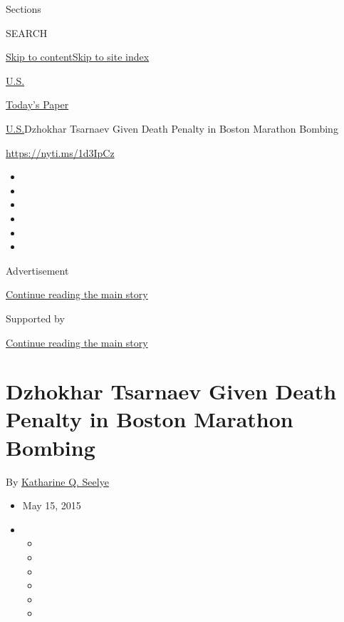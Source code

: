 Sections

SEARCH

\protect\hyperlink{site-content}{Skip to
content}\protect\hyperlink{site-index}{Skip to site index}

\href{https://www.nytimes.com/section/us}{U.S.}

\href{https://myaccount.nytimes.com/auth/login?response_type=cookie\&client_id=vi}{}

\href{https://www.nytimes.com/section/todayspaper}{Today's Paper}

\href{/section/us}{U.S.}\textbar{}Dzhokhar Tsarnaev Given Death Penalty
in Boston Marathon Bombing

\url{https://nyti.ms/1d3IpCz}

\begin{itemize}
\item
\item
\item
\item
\item
\item
\end{itemize}

Advertisement

\protect\hyperlink{after-top}{Continue reading the main story}

Supported by

\protect\hyperlink{after-sponsor}{Continue reading the main story}

\hypertarget{dzhokhar-tsarnaev-given-death-penalty-in-boston-marathon-bombing}{%
\section{Dzhokhar Tsarnaev Given Death Penalty in Boston Marathon
Bombing}\label{dzhokhar-tsarnaev-given-death-penalty-in-boston-marathon-bombing}}

By \href{http://www.nytimes.com/by/katharine-q-seelye}{Katharine Q.
Seelye}

\begin{itemize}
\item
  May 15, 2015
\item
  \begin{itemize}
  \item
  \item
  \item
  \item
  \item
  \item
  \end{itemize}
\end{itemize}

